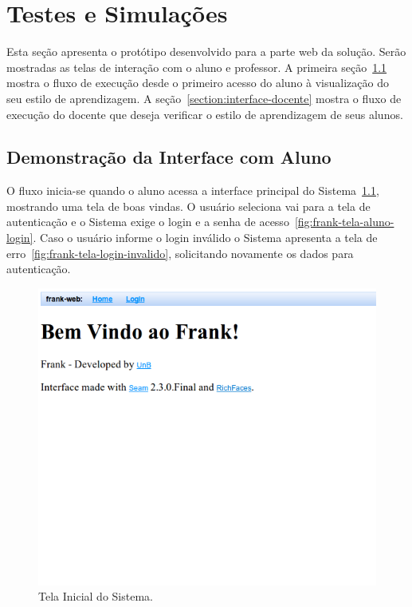 \chapter{Testes e Simulações}

Esta seção apresenta o protótipo desenvolvido para a parte web da solução. Serão mostradas as telas de interação com o aluno e professor. A primeira seção~\ref{section:interface-aluno} mostra o fluxo de execução desde o primeiro acesso do aluno à visualização do seu estilo de aprendizagem. A seção~\ref{section:interface-docente} mostra o fluxo de execução do docente que deseja verificar o estilo de aprendizagem de seus alunos.

\section{Demonstração da Interface com Aluno}\label{section:interface-aluno}
O fluxo inicia-se quando o aluno acessa a interface principal do Sistema~\ref{fig:frank-tela-aluno-inicial}, mostrando uma tela de boas vindas. O usuário seleciona vai para a tela de autenticação e o Sistema exige o login e a senha de acesso~\ref{fig:frank-tela-aluno-login}. Caso o usuário informe o login inválido o Sistema apresenta a tela de erro~\ref{fig:frank-tela-login-invalido}, solicitando novamente os dados para autenticação.

\begin{figure}
	\centering
	\includegraphics[scale=0.6]{images/frank-tela-aluno-inicial.png}
	\caption{Tela Inicial do Sistema.}
	\label{fig:frank-tela-aluno-inicial}
\end{figure}


